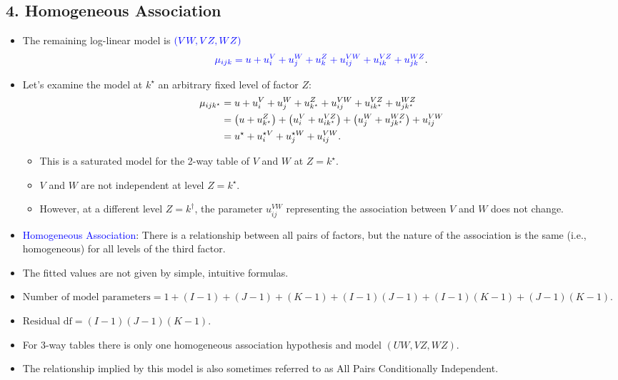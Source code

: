 \documentclass{article}\usepackage[]{graphicx}\usepackage[svgnames]{xcolor}
\let\log\relax%
\begin{document}
\subsection*{4. Homogeneous Association}
\begin{itemize}
      \item The remaining log-linear model is $ \textcolor{Blue}{(VW,VZ,WZ)} $
            \[ \textcolor{Blue}{\log{\mu_{ijk}}=u+u_i^V+u_j^W+u_k^Z+u_{ij}^{VW}+u_{ik}^{VZ}+u_{jk}^{WZ}}. \]
      \item Let's examine the model at $ k^\star $ an arbitrary fixed level of factor $ Z $:
            \begin{align*}
                  \log \mu_{i j k^{\star}} & =u+u_{i}^{V}+u_{j}^{W}+u_{k^{\star}}^{Z}+u_{i j}^{V W}+u_{i k^{\star}}^{V Z}+u_{j k^{\star}}^{W Z}                                        \\
                                           & =\left(u+u_{k^{\star}}^{Z}\right)+\left(u_{i}^{V}+u_{i k^{\star}}^{V Z}\right)+\left(u_{j}^{W}+u_{j k^{\star}}^{W Z}\right)+u_{i j}^{V W} \\
                                           & =u^{\star}+u_{i}^{\star V}+u_{j}^{\star W}+u_{i j}^{V W}.
            \end{align*}
            \begin{itemize}
                  \item This is a saturated model for the 2-way table of $ V $ and $ W $ at $ Z=k^\star $.
                  \item $ V $ and $ W $ are not independent at level $ Z=k^\star $.
                  \item However, at a different level $ Z=k^\dagger $, the parameter $ u_{ij}^{VW} $ representing the association between $ V $ and $ W $
                        does not change.
            \end{itemize}
      \item \textcolor{Blue}{Homogeneous Association}: There is a relationship between all pairs of factors, but
            the nature of the association is the same (i.e., homogeneous) for all levels of the
            third factor.
      \item The fitted values are not given by simple, intuitive formulas.
      \item $ \text{Number of model parameters}=1 + (I- 1) + (J- 1) + (K- 1) + (I- 1)(J- 1) + (I- 1)(K- 1) + (J- 1)(K- 1) $.
      \item $ \text{Residual df}=(I- 1)(J- 1)(K- 1) $.
      \item For 3-way tables there is only one homogeneous association hypothesis and model
            $(UW, VZ, WZ)$.
      \item The relationship implied by this model is also sometimes referred to as All Pairs
            Conditionally Independent.
\end{itemize}
\end{document}
